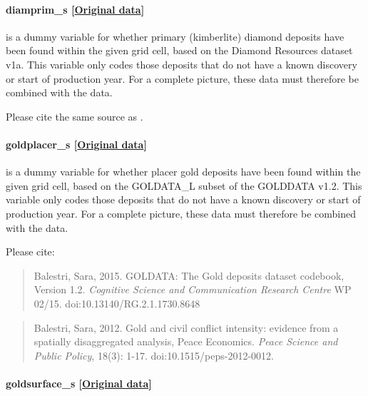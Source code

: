 \documentclass[]{book}
\begin{document}
\paragraph{diamprim\_s
{[}\href{https://www.prio.org/Data/Geographical-and-Resource-Datasets/Diamond-Resources/}{Original
data}{]}}\label{diamprim-s}

is a dummy variable for whether primary (kimberlite) diamond deposits
have been found within the given grid cell, based on the Diamond
Resources dataset v1a. This variable only codes those deposits that do
not have a known discovery or start of production year. For a complete
picture, these data must therefore be combined with the
 data.

Please cite the same source as .

\paragraph{goldplacer\_s
{[}\href{http://www.researchgate.net/profile/Sara_Balestri}{Original
data}{]}}\label{goldplacer-s}

is a dummy variable for whether placer gold deposits have been found
within the given grid cell, based on the GOLDATA\_L subset of the
GOLDDATA v1.2. This variable only codes those deposits that do not have
a known discovery or start of production year. For a complete picture,
these data must therefore be combined with the 
data.

Please cite:

\begin{quote}
Balestri, Sara, 2015. GOLDATA: The Gold deposits dataset codebook,
Version 1.2. \emph{Cognitive Science and Communication Research Centre}
WP 02/15. doi:10.13140/RG.2.1.1730.8648
\end{quote}

\begin{quote}
Balestri, Sara, 2012. Gold and civil conflict intensity: evidence from a
spatially disaggregated analysis, Peace Economics. \emph{Peace Science
and Public Policy}, 18(3): 1-17. doi:10.1515/peps-2012-0012.
\end{quote}

\paragraph{goldsurface\_s
{[}\href{http://www.researchgate.net/profile/Sara_Balestri}{Original
data}{]}}\label{goldsurface-s}
\end{document}
